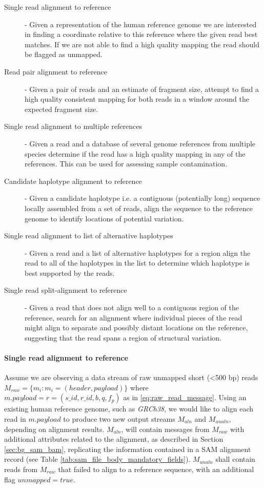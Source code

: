 \begin{description}
    \item [Single read alignment to reference] - Given a representation of the human reference genome we are interested in finding a coordinate relative to this reference where the given read best matches. If we are not able to find a high quality mapping the read should be flagged as unmapped.
    \item [Read pair alignment to reference] - Given a pair of reads and an estimate of fragment size, attempt to find a high quality consistent mapping for both reads in a window around the expected fragment size.
    \item [Single read alignment to multiple references] - Given a read and a database of several genome references from multiple species determine if the read has a high quality mapping in any of the references. This can be used for assessing sample contamination.
    \item [Candidate haplotype alignment to reference] - Given a candidate haplotype i.e. a contiguous (potentially long) sequence locally assembled from a set of reads, align the sequence to the reference genome to identify locations of potential variation.
    \item [Single read alignment to list of alternative haplotypes] - Given a read and a list of alternative haplotypes for a region align the read to all of the haplotypes in the list to determine which haplotype is best supported by the reads.
    \item [Single read split-alignment to reference] - Given a read that does not align well to a contiguous region of the reference, search for an alignment where individual pieces of the read might align to separate and possibly distant locations on the reference, suggesting that the read spans a region of structural variation.
\end{description}

\paragraph{Single read alignment to reference} 
Assume we are observing a data stream of raw unmapped short (<500 bp) reads $M_{raw} = \{m_i: m_i = (header, payload)\}$ where $m.payload = r = (s\_id, r\_id, b, q, f_p)$ as in \ref{eq:raw_read_message}. Using an existing human reference genome, such as \emph{GRCh38}, we would like to align each read in $m.payload$ to produce two new output streams $M_{aln}$ and $M_{unaln}$, depending on alignment results. $M_{aln}$, will contain messages from $M_{raw}$ with additional attributes related to the alignment, as described in Section \ref{sec:bg_sam_bam}, replicating the information contained in a SAM alignment record (see Table \ref{tab:sam_file_body_mandatory_fields}). $M_{unaln}$ shall contain reads from $M_{raw}$ that failed to align to a reference sequence, with an additional flag $unmapped=true$.

